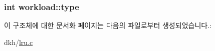 \hypertarget{structworkload_aa2845ad1d10cf7ef276771aa7c038c40}{
\subsubsection[{type}]{\setlength{\rightskip}{0pt plus 5cm}int workload\+::type}}\label{structworkload_aa2845ad1d10cf7ef276771aa7c038c40}


이 구조체에 대한 문서화 페이지는 다음의 파일로부터 생성되었습니다.\+:\begin{DoxyCompactItemize}
\item 
dkh/\hyperlink{lru_8c}{lru.\+c}\end{DoxyCompactItemize}
